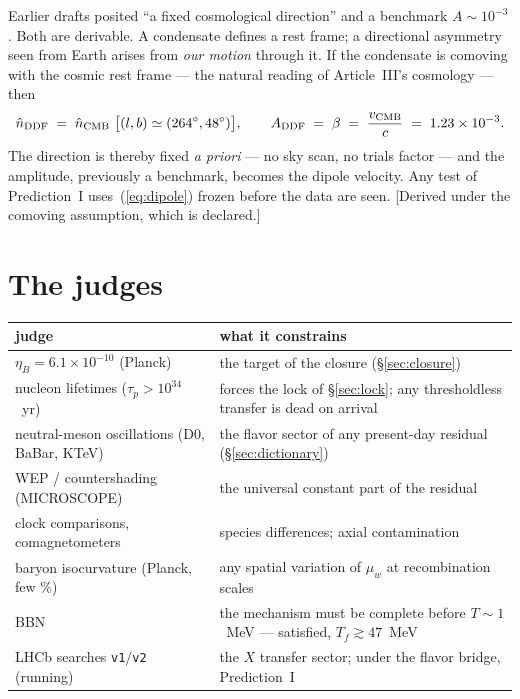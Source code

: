 \documentclass[11pt,a4paper]{article}
\begin{document}
Earlier drafts posited ``a fixed cosmological direction'' and a benchmark
$A\sim10^{-3}$. Both are derivable. A condensate defines a rest frame; a
directional asymmetry seen from Earth arises from \emph{our motion} through
it. If the condensate is comoving with the cosmic rest frame --- the natural
reading of Article~III's cosmology --- then
\begin{equation}
\hat n_{\rm DDF} \;=\; \hat n_{\rm CMB}\ \big[(l,b)\simeq(264^\circ,48^\circ)\big],
\qquad
A_{\rm DDF} \;=\; \beta \;=\; \frac{v_{\rm CMB}}{c} \;=\; 1.23\times10^{-3}.
\label{eq:dipole}
\end{equation}
The direction is thereby fixed \emph{a priori} --- no sky scan, no trials
factor --- and the amplitude, previously a benchmark, becomes the dipole
velocity. Any test of Prediction~I uses~(\ref{eq:dipole}) frozen before the
data are seen. [Derived under the comoving assumption, which is declared.]



\section{The judges}
\label{sec:judges}

\begin{center}\small
\begin{tabular}{p{4.4cm}p{9.2cm}}
\toprule
judge & what it constrains \\
\midrule
$\eta_B=6.1\times10^{-10}$ (Planck) & the target of the closure
(\S\ref{sec:closure}) \\
nucleon lifetimes ($\tau_p>10^{34}$~yr) & forces the lock of \S\ref{sec:lock};
any thresholdless transfer is dead on arrival \\
neutral-meson oscillations (D0, BaBar, KTeV) & the flavor sector of any
present-day residual (\S\ref{sec:dictionary}) \\
WEP / countershading (MICROSCOPE) & the universal constant part of the
residual \\
clock comparisons, comagnetometers & species differences; axial contamination \\
baryon isocurvature (Planck, few \%) & any spatial variation of $\mu_w$ at
recombination scales \\
BBN & the mechanism must be complete before $T\sim1$~MeV --- satisfied,
$T_f\gtrsim47$~MeV \\
LHCb searches \texttt{v1}/\texttt{v2} (running) & the $X$ transfer sector;
under the flavor bridge, Prediction~I \\
\bottomrule
\end{tabular}
\end{center}
\end{document}

